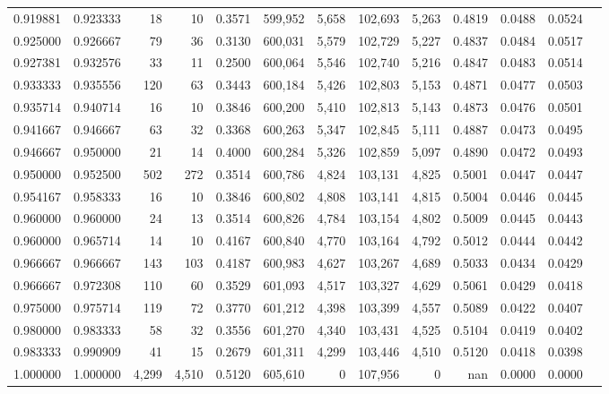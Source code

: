 \begin{tabular}{rrrrrrrrrrrrr}
0.919881 & 0.923333 &     18 &     10 &                                     0.3571 & 599,952 &   5,658 & 102,693 &   5,263 & 0.4819 & 0.0488 & 0.0524 \\
0.925000 & 0.926667 &     79 &     36 &                                     0.3130 & 600,031 &   5,579 & 102,729 &   5,227 & 0.4837 & 0.0484 & 0.0517 \\
0.927381 & 0.932576 &     33 &     11 &                                     0.2500 & 600,064 &   5,546 & 102,740 &   5,216 & 0.4847 & 0.0483 & 0.0514 \\
0.933333 & 0.935556 &    120 &     63 &                                     0.3443 & 600,184 &   5,426 & 102,803 &   5,153 & 0.4871 & 0.0477 & 0.0503 \\
0.935714 & 0.940714 &     16 &     10 &                                     0.3846 & 600,200 &   5,410 & 102,813 &   5,143 & 0.4873 & 0.0476 & 0.0501 \\
0.941667 & 0.946667 &     63 &     32 &                                     0.3368 & 600,263 &   5,347 & 102,845 &   5,111 & 0.4887 & 0.0473 & 0.0495 \\
0.946667 & 0.950000 &     21 &     14 &                                     0.4000 & 600,284 &   5,326 & 102,859 &   5,097 & 0.4890 & 0.0472 & 0.0493 \\
0.950000 & 0.952500 &    502 &    272 &                                     0.3514 & 600,786 &   4,824 & 103,131 &   4,825 & 0.5001 & 0.0447 & 0.0447 \\
0.954167 & 0.958333 &     16 &     10 &                                     0.3846 & 600,802 &   4,808 & 103,141 &   4,815 & 0.5004 & 0.0446 & 0.0445 \\
0.960000 & 0.960000 &     24 &     13 &                                     0.3514 & 600,826 &   4,784 & 103,154 &   4,802 & 0.5009 & 0.0445 & 0.0443 \\
0.960000 & 0.965714 &     14 &     10 &                                     0.4167 & 600,840 &   4,770 & 103,164 &   4,792 & 0.5012 & 0.0444 & 0.0442 \\
0.966667 & 0.966667 &    143 &    103 &                                     0.4187 & 600,983 &   4,627 & 103,267 &   4,689 & 0.5033 & 0.0434 & 0.0429 \\
0.966667 & 0.972308 &    110 &     60 &                                     0.3529 & 601,093 &   4,517 & 103,327 &   4,629 & 0.5061 & 0.0429 & 0.0418 \\
0.975000 & 0.975714 &    119 &     72 &                                     0.3770 & 601,212 &   4,398 & 103,399 &   4,557 & 0.5089 & 0.0422 & 0.0407 \\
0.980000 & 0.983333 &     58 &     32 &                                     0.3556 & 601,270 &   4,340 & 103,431 &   4,525 & 0.5104 & 0.0419 & 0.0402 \\
0.983333 & 0.990909 &     41 &     15 &                                     0.2679 & 601,311 &   4,299 & 103,446 &   4,510 & 0.5120 & 0.0418 & 0.0398 \\
1.000000 & 1.000000 &  4,299 &  4,510 &                                     0.5120 & 605,610 &       0 & 107,956 &       0 &    nan & 0.0000 & 0.0000 \\
\bottomrule
\end{tabular}
